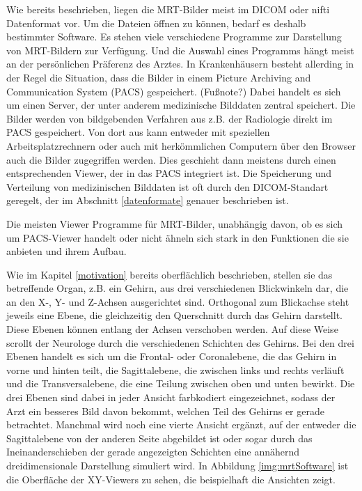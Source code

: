 Wie bereits beschrieben, liegen die MRT-Bilder meist im DICOM oder nifti Datenformat vor. Um die Dateien öffnen zu können, bedarf es deshalb bestimmter Software. Es stehen viele verschiedene Programme zur Darstellung von MRT-Bildern zur Verfügung. Und die Auswahl eines Programms hängt meist an der persönlichen Präferenz des Arztes. 
In Krankenhäusern besteht allerding in der Regel die Situation, dass die Bilder in einem Picture Archiving and Communication System (PACS) gespeichert. (Fußnote?) Dabei handelt es sich um einen Server, der unter anderem medizinische Bilddaten zentral speichert. Die Bilder werden von bildgebenden Verfahren aus z.B. der Radiologie direkt im PACS gespeichert. Von dort aus kann entweder mit speziellen Arbeitsplatzrechnern oder auch mit herkömmlichen Computern über den Browser auch die Bilder zugegriffen werden. Dies geschieht dann meistens durch einen entsprechenden Viewer, der in das PACS integriert ist. Die Speicherung und Verteilung von medizinischen Bilddaten ist oft durch den DICOM-Standart geregelt, der im Abschnitt \ref{datenformate} genauer beschrieben ist.

Die meisten Viewer Programme für MRT-Bilder, unabhängig davon, ob es sich um PACS-Viewer handelt oder nicht ähneln sich stark in den Funktionen die sie anbieten und ihrem Aufbau.

Wie im Kapitel \ref{motivation} bereits oberflächlich beschrieben, stellen sie das betreffende Organ, z.B. ein Gehirn, aus drei verschiedenen Blickwinkeln dar, die an den X-, Y- und Z-Achsen ausgerichtet sind. Orthogonal zum Blickachse steht jeweils eine Ebene, die gleichzeitig den Querschnitt durch das Gehirn darstellt. Diese Ebenen können entlang der Achsen verschoben werden. Auf diese Weise scrollt der Neurologe durch die verschiedenen Schichten des Gehirns. 
Bei den drei Ebenen handelt es sich um die Frontal- oder Coronalebene, die das Gehirn in vorne und hinten teilt, die Sagittalebene, die zwischen links und rechts verläuft und die Transversalebene, die eine Teilung zwischen oben und unten bewirkt. 
Die drei Ebenen sind dabei in jeder Ansicht farbkodiert eingezeichnet, sodass der Arzt ein besseres Bild davon bekommt, welchen Teil des Gehirns er gerade betrachtet. 
Manchmal wird noch eine vierte Ansicht ergänzt, auf der entweder die Sagittalebene von der anderen Seite abgebildet ist oder sogar durch das Ineinanderschieben der gerade angezeigten Schichten eine annähernd dreidimensionale Darstellung simuliert wird. 
In Abbildung \ref{img:mrtSoftware} ist die Oberfläche der XY-Viewers zu sehen, die beispielhaft die Ansichten zeigt.

